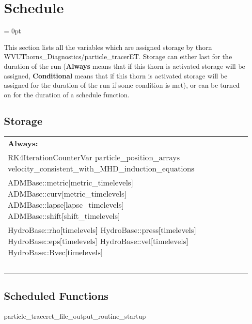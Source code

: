 
\section{Schedule} 


\parskip = 0pt


\noindent This section lists all the variables which are assigned storage by thorn WVUThorns\_Diagnostics/particle\_tracerET.  Storage can either last for the duration of the run ({\bf Always} means that if this thorn is activated storage will be assigned, {\bf Conditional} means that if this thorn is activated storage will be assigned for the duration of the run if some condition is met), or can be turned on for the duration of a schedule function.


\subsection*{Storage}

\hspace{5mm}

 \begin{tabular*}{160mm}{ll} 

{\bf Always:}&  ~ \\ 
 RK4IterationCounterVar particle\_position\_arrays velocity\_consistent\_with\_MHD\_induction\_equations & ~\\ 
 ADMBase::metric[metric\_timelevels] ADMBase::curv[metric\_timelevels] ADMBase::lapse[lapse\_timelevels] ADMBase::shift[shift\_timelevels] & ~\\ 
 HydroBase::rho[timelevels] HydroBase::press[timelevels] HydroBase::eps[timelevels] HydroBase::vel[timelevels] HydroBase::Bvec[timelevels] & ~\\ 
~ & ~\\ 
\end{tabular*} 


\subsection*{Scheduled Functions}
\vspace{5mm}


\hspace{5mm} particle\_traceret\_file\_output\_routine\_startup 

\hspace{5mm}{\it create directory for file output. } 


\hspace{5mm}

